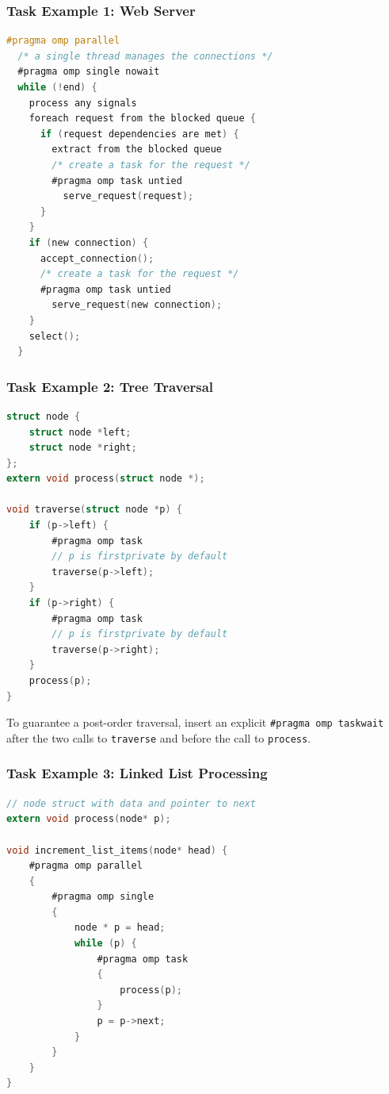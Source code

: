 \begin{frame}[fragile]
\frametitle{Task Example 1: Web Server}

\begin{lstlisting}[language=C,morekeywords={foreach,pragma,omp,parallel,single,nowait,task,untied,barrier,taskyield}]
#pragma omp parallel
  /* a single thread manages the connections */
  #pragma omp single nowait
  while (!end) {
    process any signals
    foreach request from the blocked queue {
      if (request dependencies are met) {
        extract from the blocked queue
        /* create a task for the request */
        #pragma omp task untied
          serve_request(request);
      }
    }
    if (new connection) {
      accept_connection();
      /* create a task for the request */
      #pragma omp task untied
        serve_request(new connection);
    }
    select();
  }
\end{lstlisting}

\end{frame}


\begin{frame}[fragile]
\frametitle{Task Example 2: Tree Traversal}

  \begin{lstlisting}[language=C]
struct node {
    struct node *left;
    struct node *right;
};
extern void process(struct node *);

void traverse(struct node *p) {
    if (p->left) {
        #pragma omp task
        // p is firstprivate by default
        traverse(p->left);
    }
    if (p->right) {
        #pragma omp task
        // p is firstprivate by default
        traverse(p->right);
    }
    process(p);
}    
  \end{lstlisting}

To guarantee a post-order traversal,
insert an explicit \verb+#pragma omp taskwait+
after the two calls to {\tt traverse} and before the
call to {\tt process}.

\end{frame}


\begin{frame}[fragile]
\frametitle{Task Example 3: Linked List Processing}
 \begin{lstlisting}[language=C]
// node struct with data and pointer to next
extern void process(node* p);

void increment_list_items(node* head) {
    #pragma omp parallel
    {
        #pragma omp single
        {
            node * p = head;
            while (p) {
                #pragma omp task
                {
                    process(p);
                }
                p = p->next;
            }
        }
    }
}
  \end{lstlisting}

\end{frame}


